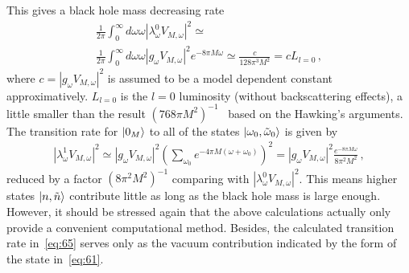 \documentclass[12pt,a4paper]{article}
\begin{document}
This gives a black hole mass decreasing rate
\begin{multline}
\label{eq:65}
\frac{1}{2\pi}\int_{0}^{\infty}
d{\omega}\omega|\lambda^{0}_{\omega}V_{M,\omega}|^2\simeq\\
\frac{1}{2\pi}\int_{0}^{\infty}
d{\omega}\omega|g_{\omega}V_{M,\omega}|^2e^{-8\pi M\omega} \simeq
\frac{c}{128\pi^3 M^2}=cL_{l=0} \,,
\end{multline}
where $c=|g_{\omega}V_{M,\omega}|^2$ is assumed to be a model
dependent constant approximatively. $L_{l=0}$ is the $l=0$
luminosity (without backscattering effects), a little smaller than the result $(768\pi M^2)^{-1}$~\cite{j} based on the Hawking's arguments. The transition
rate for $\arrowvert0_M\rangle$ to all of the states
$\arrowvert\omega_0,\tilde{\omega}_0\rangle$ is given by
\begin{equation}
\label{eq:66}
\begin{split}
|\lambda^{1}_{\omega}V_{M,\omega}|^2\simeq
|g_{\omega}V_{M,\omega}|^2(\sum_{\omega_0}e^{-4\pi
M(\omega+\omega_0)})^2=|g_{\omega}V_{M,\omega}|^2\frac{e^{-8\pi
M\omega}}{8\pi^2 M^2} \,,
\end{split}
\end{equation}
reduced by a factor $(8\pi^2 M^2)^{-1}$ comparing with
$|\lambda^{0}_{\omega}V_{M,\omega}|^2$. This means higher states $\arrowvert n,\tilde{n}\rangle$ contribute little as long as the black hole mass is
large enough. However, it should be stressed again that the above calculations actually only provide a convenient computational method. Besides, the calculated transition rate in~\eqref{eq:65} serves only as the vacuum contribution indicated by the form of the state in~\eqref{eq:61}.
\end{document}
